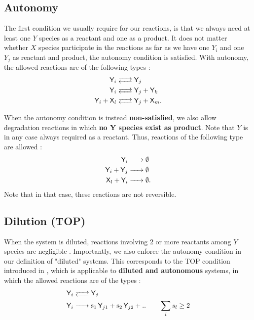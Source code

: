 \documentclass{article}
\begin{document}
\subsection{Autonomy}\label{aut}
The first condition we usually require for our reactions, is that we always need at least one $Y$ species as a reactant and one as a product. It does not matter whether $X$ species participate in the reactions as far as we have one $Y_i$ and one $Y_j$ as reactant and product, the autonomy condition is satisfied. With autonomy, the allowed reactions are of the following types :
\begin{equation}
\label{set_reactions}
		\begin{split}
		\ce{\textsf{Y}_i & <--> \textsf{Y}_j } \\ 
\ce{\textsf{Y}_i & <--> \textsf{Y}_j + \textsf{Y}_k} \\ \ce{\textsf{Y}_i + \textsf{X}_l & <--> \textsf{Y}_j + \textsf{X}_m}.	
		\end{split} 
\end{equation}

When the autonomy condition is instead \textbf{non-satisfied}, we also allow  degradation reactions in which \textbf{no Y species exist as product}. Note that $Y$ is in any case always required as a reactant. Thus, reactions of the following type are allowed :
\begin{equation}
\begin{split}
\ce{\textsf{Y}_i & -> $\emptyset$ } \\ 
\ce{\textsf{Y}_i +\textsf{Y}_j  & -> $\emptyset$}\\ 
\ce{\textsf{X}_l +\textsf{Y}_i  & -> $\emptyset$}.
\end{split} 
\end{equation}
Note that in that case, these reactions are not reversible.


\subsection{Dilution (TOP)}\label{deg}
When the system is diluted, reactions involving 2 or more reactants among $Y$ species are negligible \cite{2}. 
Importantly, we also enforce the autonomy condition in our definition of "diluted" systems. This corresponds to the TOP condition introduced in \cite{2}, which is applicable to \textbf{diluted and autonomous} systems, in which the allowed reactions are of the types :
\begin{equation}
		\begin{split}
\ce{\textsf{Y}_i & <--> \textsf{Y}_j } \\ 
\ce{\textsf{Y}_i & -> s_1 \textsf{Y}_{j1} + s_2 \textsf{Y}_{j2} + .. } \quad \quad \sum_l s_l \ge 2 \\ 
\end{split} 
\end{equation}
\end{document}
